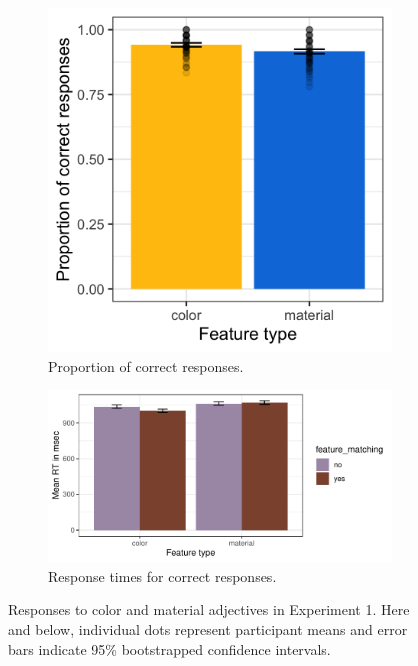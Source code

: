 \documentclass[12pt,letterpaper]{article}
\begin{document}
\begin{figure}[ht]
\centering
\begin{subfigure}{.4\textwidth}
\centering
\includegraphics[width=\textwidth]{plots/exp1_proportion.png}
\caption{Proportion of correct responses.}
\label{fig:exp1_a}
\end{subfigure} \hspace{9mm}
\begin{subfigure}{.4 \textwidth}
\centering
\includegraphics[width=\textwidth]{plots/exp1_rt.png}
\caption{Response times for correct responses.}
\label{fig:exp1_b}
\end{subfigure}
\caption{Responses to color and material adjectives in Experiment 1. Here and below, individual dots represent participant means and error bars indicate 95\% bootstrapped confidence intervals.}
\label{fig:exp1}
\end{figure}  
\end{document}
